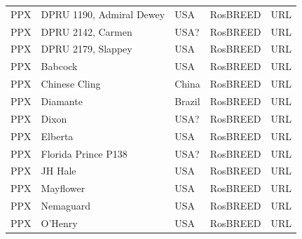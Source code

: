 \documentclass[12pt]{article}
\begin{document}
\begin{center}
\begin{longtable}{lllll}
                 PP{\color{red}X} &DPRU 1190, Admiral Dewey&USA &RosBREED &URL \\
                 PP{\color{red}X} &DPRU 2142, Carmen &USA? &RosBREED &URL \\
                 PP{\color{red}X} &DPRU 2179, Slappey &USA &RosBREED &URL \\
                 PP{\color{red}X} &Babcock&USA &RosBREED &URL \\
                 PP{\color{red}X} &Chinese Cling&China &RosBREED &URL \\
                 PP{\color{red}X} &Diamante&Brazil &RosBREED &URL \\
                 PP{\color{red}X} &Dixon&USA? &RosBREED &URL \\
                 PP{\color{red}X} &Elberta&USA &RosBREED &URL \\
                 PP{\color{red}X} &Florida Prince P138&USA? &RosBREED &URL \\
                 PP{\color{red}X} &JH Hale&USA &RosBREED &URL \\
                 PP{\color{red}X} &Mayflower&USA &RosBREED &URL \\
                 PP{\color{red}X} &Nemaguard &USA &RosBREED &URL \\
                 PP{\color{red}X} &O’Henry &USA &RosBREED &URL \\

\end{longtable}
\end{center}
\end{document}
